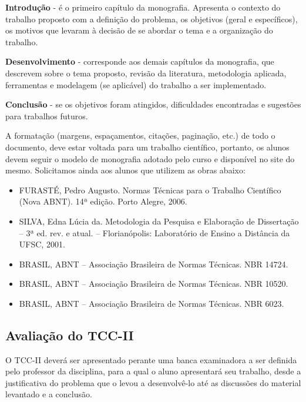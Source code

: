 \textbf{Introdução} - é o primeiro capítulo da monografia. Apresenta o contexto do trabalho proposto com a definição do problema, os objetivos (geral e específicos), os motivos que levaram à decisão de se abordar o tema e a organização do trabalho.

\textbf{Desenvolvimento} - corresponde aos demais capítulos da monografia, que descrevem sobre o tema proposto, revisão da literatura, metodologia aplicada, ferramentas e modelagem (se aplicável) do trabalho a ser implementado.

\textbf{Conclusão} - se os objetivos foram atingidos, dificuldades encontradas e sugestões para trabalhos futuros.

A formatação (margens, espaçamentos, citações, paginação, etc.) de todo o documento, deve estar voltada para um trabalho científico, portanto, 
os alunos devem seguir o modelo de monografia adotado pelo curso e disponível no site do mesmo. 
Solicitamos ainda aos alunos que utilizem as obras abaixo:

	\begin{itemize}	
		\item  FURASTÉ, Pedro Augusto. Normas Técnicas para o Trabalho Científico (Nova ABNT). 14ª edição. Porto Alegre, 2006.

		\item SILVA, Edna Lúcia da. Metodologia da Pesquisa e Elaboração de Dissertação – 3ª ed. rev. e atual. – Florianópolis: Laboratório de Ensino a Distância da 			UFSC, 2001.

		\item BRASIL, ABNT – Associação Brasileira de Normas Técnicas. NBR 14724.

		\item BRASIL, ABNT – Associação Brasileira de Normas Técnicas. NBR 10520.

		\item BRASIL, ABNT – Associação Brasileira de Normas Técnicas. NBR 6023.
	\end{itemize}


\subsection{Avaliação do TCC-II}

O TCC-II deverá ser apresentado perante uma banca examinadora a ser definida pelo professor da disciplina, para a qual o aluno apresentará seu trabalho, desde a justificativa do problema que o levou a desenvolvê-lo até as discussões do material levantado e a conclusão.

